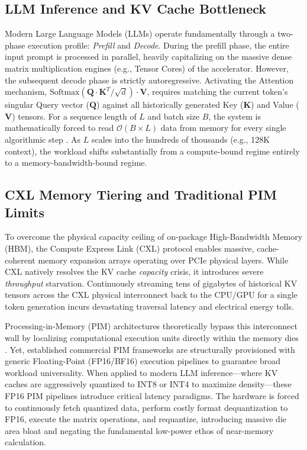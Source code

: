\documentclass[10pt,conference]{IEEEtran}
\begin{document}
\subsection{LLM Inference and KV Cache Bottleneck}
Modern Large Language Models (LLMs) operate fundamentally through a two-phase execution profile: \textit{Prefill} and \textit{Decode}. During the prefill phase, the entire input prompt is processed in parallel, heavily capitalizing on the massive dense matrix multiplication engines (e.g., Tensor Cores) of the accelerator. However, the subsequent decode phase is strictly autoregressive. Activating the Attention mechanism, $\text{Softmax}(\mathbf{Q} \cdot \mathbf{K}^T / \sqrt{d}) \cdot \mathbf{V}$, requires matching the current token's singular Query vector ($\mathbf{Q}$) against all historically generated Key ($\mathbf{K}$) and Value ($\mathbf{V}$) tensors. For a sequence length of $L$ and batch size $B$, the system is mathematically forced to read $\mathcal{O}(B \times L)$ data from memory for every single algorithmic step \cite{kv_cache_bottleneck}. As $L$ scales into the hundreds of thousands (e.g., 128K context), the workload shifts substantially from a compute-bound regime entirely to a memory-bandwidth-bound regime.

\subsection{CXL Memory Tiering and Traditional PIM Limits}
To overcome the physical capacity ceiling of on-package High-Bandwidth Memory (HBM), the Compute Express Link (CXL) protocol \cite{cxl_standard} enables massive, cache-coherent memory expansion arrays operating over PCIe physical layers. While CXL natively resolves the KV cache \textit{capacity} crisis, it introduces severe \textit{throughput} starvation. Continuously streaming tens of gigabytes of historical KV tensors across the CXL physical interconnect back to the CPU/GPU for a single token generation incurs devastating traversal latency and electrical energy tolls.

Processing-in-Memory (PIM) architectures theoretically bypass this interconnect wall by localizing computational execution units directly within the memory dies \cite{samsung_pim}. Yet, established commercial PIM frameworks are structurally provisioned with generic Floating-Point (FP16/BF16) execution pipelines to guarantee broad workload universality. When applied to modern LLM inference—where KV caches are aggressively quantized to INT8 or INT4 \cite{llm_int8} to maximize density—these FP16 PIM pipelines introduce critical latency paradigms. The hardware is forced to continuously fetch quantized data, perform costly format dequantization to FP16, execute the matrix operations, and requantize, introducing massive die area bloat and negating the fundamental low-power ethos of near-memory calculation.
\end{document}
